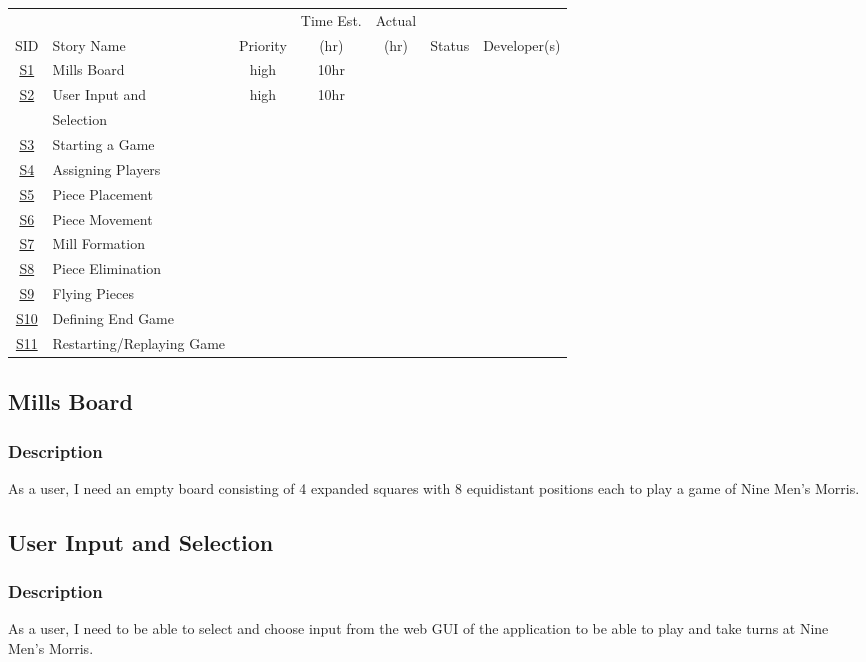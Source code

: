 \documentclass[11pt]{article}
\begin{document}
\begin{center}
\begin{tabular}{|c|m{3.5cm}|c|c|c|c|c|}
 &  &  & Time Est. & Actual &  & \\
SID & Story Name & Priority & (hr) & (hr) & Status & Developer(s)\\
\hline
\hyperref[sec:org3f5f910]{S1} & Mills Board & high & 10hr &  &  & \\
\hline
\hyperref[sec:org96ee30f]{S2} & User Input and & high & 10hr &  &  & \\
 & Selection &  &  &  &  & \\
\hline
\hyperref[sec:org0591b29]{S3} & Starting a Game &  &  &  &  & \\
\hline
\hyperref[sec:org935843e]{S4} & Assigning Players &  &  &  &  & \\
\hline
\hyperref[sec:orga4c2085]{S5} & Piece Placement &  &  &  &  & \\
\hline
\hyperref[sec:org67107d5]{S6} & Piece Movement &  &  &  &  & \\
\hline
\hyperref[sec:org2525b34]{S7} & Mill Formation &  &  &  &  & \\
\hline
\hyperref[sec:orga001de4]{S8} & Piece Elimination &  &  &  &  & \\
\hline
\hyperref[sec:org6817def]{S9} & Flying Pieces &  &  &  &  & \\
\hline
\hyperref[sec:org25e89ad]{S10} & Defining End Game &  &  &  &  & \\
\hline
\hyperref[sec:orgd356751]{S11} & Restarting/Replaying Game &  &  &  &  & \\
\end{tabular}
\end{center}


\subsection{Mills Board}
\label{sec:org3f5f910}
\subsubsection*{Description}
\label{sec:org1b49fd5}
As a user, I need an empty board consisting of 4 expanded squares with 8 equidistant positions
each to play a game of Nine Men's Morris.
\subsection{User Input and Selection}
\label{sec:org96ee30f}
\subsubsection*{Description}
\label{sec:org19fc73b}
As a user, I need to be able to select and choose input from the web GUI of the application to
be able to play and take turns at Nine Men's Morris.
\end{document}

